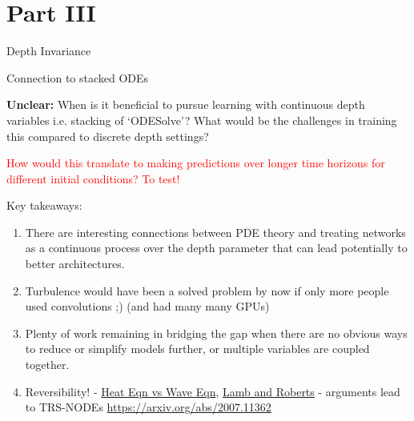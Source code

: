 \documentclass[usenames,dvipsnames]{beamer}
\theoremstyle{definition}
\begin{document}
\section{Part III}
\begin{frame}{Depth Invariance}
    
\end{frame}


\begin{frame}{Connection to stacked ODEs}

\end{frame}

\begin{frame}
\textbf{Unclear:} When is it beneficial to pursue learning with continuous depth variables i.e. stacking of `ODESolve'? What would be the challenges in training this compared to discrete depth settings?


\textcolor{red}{How would this translate to making predictions over longer time horizons for different initial conditions? To test!}

\end{frame}

\begin{frame}{Key takeaways:}
    \begin{enumerate}
        \item There are interesting connections between PDE theory and treating networks as a continuous process over the depth parameter that can lead potentially to better architectures.
        
        \item Turbulence would have been a solved problem by now if only more people used convolutions ;) (and had many many GPUs)
        
        \item Plenty of work remaining in bridging the gap when there are no obvious ways to reduce or simplify models further, or multiple variables are coupled together.
        
        \item Reversibility! - \href{{https://math.stackexchange.com/questions/628720/why-heat-equation-is-not-time-reversible-time-arrow-in-mathematics}}{Heat Eqn vs Wave Eqn}, \href{https://doi.org/10.1016/S0167-2789(97)00199-1}{Lamb and Roberts} - arguments lead to TRS-NODEs \url{https://arxiv.org/abs/2007.11362}
    \end{enumerate}

\end{frame}
\end{document}
